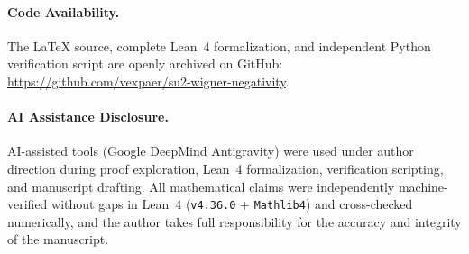 \documentclass[11pt,a4paper]{article}
\theoremstyle{remark}
\begin{document}
\paragraph*{Code Availability.}
The LaTeX source, complete Lean~4 formalization, and independent Python verification script are openly archived on GitHub: \url{https://github.com/vexpaer/su2-wigner-negativity}.

\paragraph*{AI Assistance Disclosure.}
AI-assisted tools (Google DeepMind Antigravity) were used under author direction during proof exploration, Lean~4 formalization, verification scripting, and manuscript drafting. All mathematical claims were independently machine-verified without gaps in Lean~4 (\texttt{v4.36.0} + \texttt{Mathlib4}) and cross-checked numerically, and the author takes full responsibility for the accuracy and integrity of the manuscript.
\end{document}
